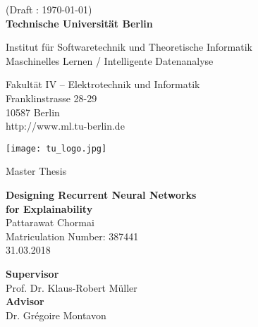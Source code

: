 \thispagestyle{empty}
\begin{center}
(Draft : \today) \\ 
\vspace*{1.4cm}
{\LARGE \textbf{Technische Universit\"at Berlin}}

\vspace{0.5cm}

{\large Institut f\"{u}r Softwaretechnik und Theoretische Informatik
\\[1mm]}
{\large Maschinelles Lernen / Intelligente Datenanalyse\\[5mm]}

Fakult\"{a}t IV -- Elektrotechnik und Informatik\\
Franklinstrasse 28-29\\
10587 Berlin\\
http://www.ml.tu-berlin.de\\

\vspace*{1cm}

\texttt{[image: tu\_logo.jpg]}

\vspace*{1.0cm}

{\LARGE{Master Thesis} }

\vspace{1.0cm}
{\LARGE \textbf{Designing Recurrent Neural Networks}}\\
\vspace*{0.3cm}
{\LARGE \textbf{ for Explainability}}\\
\vspace*{1.0cm}
{\LARGE Pattarawat Chormai}
\\
\vspace*{0.5cm}
Matriculation Number: 387441\\
31.03.2018\\ %
\vspace*{1.0cm}

\textbf{Supervisor}\\
Prof. Dr. Klaus-Robert M\"{u}ller\\
\vspace*{0.5cm}
\textbf{Advisor}\\
Dr. Gr\'{e}goire Montavon

\vspace{3cm}


\end{center}

